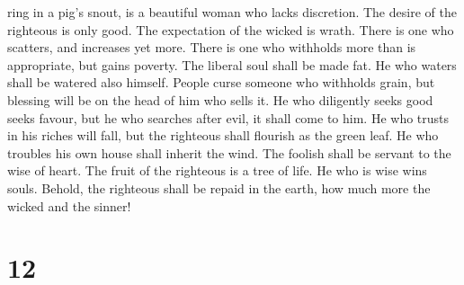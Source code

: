 ring in a pig's snout, is a beautiful woman who lacks discretion.
 The desire of the righteous is only good. The
expectation of the wicked is wrath.  There is one who
scatters, and increases yet more. There is one who withholds more than
is appropriate, but gains poverty.  The liberal soul
shall be made fat. He who waters shall be watered also himself.
 People curse someone who withholds grain, but blessing
will be on the head of him who sells it.  He who
diligently seeks good seeks favour, but he who searches after evil, it
shall come to him.  He who trusts in his riches will
fall, but the righteous shall flourish as the green leaf.
 He who troubles his own house shall inherit the wind.
The foolish shall be servant to the wise of heart.  The
fruit of the righteous is a tree of life. He who is wise wins souls.
 Behold, the righteous shall be repaid in the earth, how
much more the wicked and the sinner!

\hypertarget{section-11}{%
\section{12}\label{section-11}}

